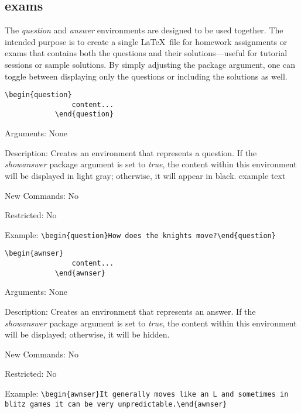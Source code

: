 \documentclass[10pt, a4paper]{article}
\newenvironment{itemizeexamplecommand}{
	\begin{itemize}
		\setlength\itemsep{-0.2em}
	}
	{
	\end{itemize}
}
\begin{document}
	\subsection{exams}
	The \textit{question} and \textit{answer} environments are designed to be used together. The intended purpose is to create a single \LaTeX\ file for homework assignments or exams that contains both the questions and their solutions—useful for tutorial sessions or sample solutions. By simply adjusting the package argument, one can toggle between displaying only the questions or including the solutions as well.
	\begin{exe}
		\ex \begin{itemizeexamplecommand}
			\item[] \begin{lstlisting}[style=B]
			\begin{question}
				content...
			\end{question}
			\end{lstlisting}
			{\scriptsize
				\item[] Arguments: None
				\item[] Description: Creates an environment that represents a question. If the \textit{showanswer} package argument is set to \textit{true}, the content within this environment will be displayed in light gray; otherwise, it will appear in black. \color{dunkelgrau}example text\color{black}\ 
				\item[] New Commands: No
				\item[] Restricted: No
				\item[] Example: \verb=\begin{question}How does the knights move?\end{question}=}
		\end{itemizeexamplecommand}
	\end{exe}
	\begin{exe}
	\ex \begin{itemizeexamplecommand}
			\item[] \begin{lstlisting}[style=B]
			\begin{awnser}
				content...
			\end{awnser}
			\end{lstlisting}
			{\scriptsize
				\item[] Arguments: None
				\item[] Description: Creates an environment that represents an answer. If the \textit{showanswer} package argument is set to \textit{true}, the content within this environment will be displayed; otherwise, it will be hidden.
				\item[] New Commands: No
				\item[] Restricted: No
				\item[] Example: \verb=\begin{awnser}It generally moves like an L and sometimes in blitz games it can be very unpredictable.\end{awnser}=}
		\end{itemizeexamplecommand}
	\end{exe}
\end{document}
